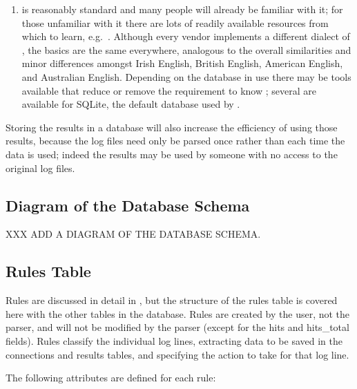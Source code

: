 \begin{enumerate}
\begin{itemize}
        \end{itemize}


    \item {} is reasonably standard and many people will already
        be familiar with it; for those unfamiliar with it there are lots of
        readily available resources from which to learn, e.g.\
        .
        Although every vendor implements a different dialect of
        , the basics are the same everywhere, analogous to the
        overall similarities and minor differences amongst Irish English,
        British English, American English, and Australian English.
        Depending on the database in use there may be tools available that
        reduce or remove the requirement to know \acronym{SQL}; several are
        available for \gls{SQLite}, the default database used by
        \parsername{}.

\end{enumerate}

Storing the results in a database will also increase the efficiency of
using those results, because the log files need only be parsed once rather
than each time the data is used; indeed the results may be used by someone
with no access to the original log files.

\subsection{Diagram of the Database Schema}

\label{Diagram of the Database Schema}

XXX ADD A DIAGRAM OF THE DATABASE SCHEMA\@.

\subsection{Rules Table}

\label{rules table}

Rules are discussed in detail in , but
the structure of the rules table is covered here with the other tables in
the database.  Rules are created by the user, not the parser, and will not
be modified by the parser (except for the hits and hits\_total fields).
Rules classify the individual log lines, extracting data to be saved in the
connections and results tables, and specifying the action to take for that
log line.

The following attributes are defined for each rule:

